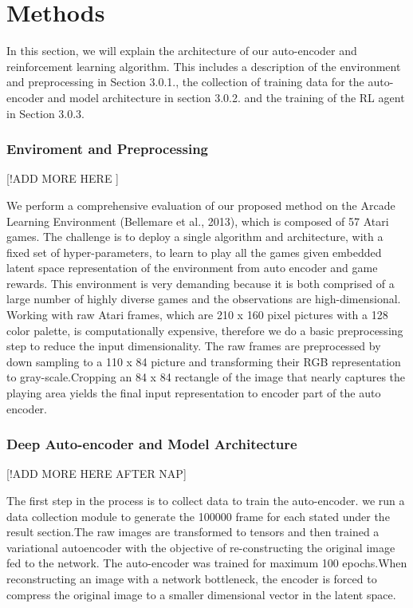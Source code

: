 \chapter{Methods }

In this section, we will explain the architecture of our auto-encoder and reinforcement learning algorithm. This includes a description of the environment and preprocessing  in Section 3.0.1., the collection of training data for the auto-encoder and model architecture in section 3.0.2. and the training of the RL agent in Section  3.0.3.


\subsection{Enviroment and Preprocessing}
[!ADD MORE HERE ]

We perform a comprehensive evaluation of our proposed method on the Arcade Learning Environment (Bellemare et al., 2013), which is composed of 57 Atari games. The challenge is to deploy a single algorithm and architecture, with a fixed set of hyper-parameters, to learn to play all the games given embedded latent space representation of the environment from auto encoder and game rewards. This environment is very demanding because it is both comprised of a large number of highly diverse games and the observations are high-dimensional.\\

Working with raw Atari frames, which are 210 x 160 pixel pictures with a 128 color palette, is computationally expensive, therefore we do a basic preprocessing step to reduce the input dimensionality. The raw frames are preprocessed by down sampling to a 110 x 84 picture and transforming their RGB representation to gray-scale.Cropping an 84 x 84 rectangle of the image that nearly captures the playing area yields the final input representation to encoder part of the auto encoder.


\subsection{Deep Auto-encoder and Model Architecture}
[!ADD MORE HERE AFTER NAP]

The first step in the process is to collect data to train the auto-encoder. we run a data collection module to generate the 100000 frame for each stated under the result section.The raw images are transformed to tensors and then trained a variational autoencoder with the objective of re-constructing the original image fed to the network. The auto-encoder was trained for maximum  100 epochs.When reconstructing an image with a network bottleneck, the encoder is forced to compress the original image to a smaller dimensional vector in the latent space.

